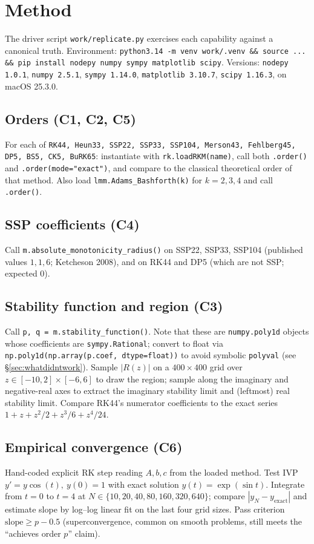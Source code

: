 \documentclass[11pt]{article}
\begin{document}
\section{Method}
The driver script \texttt{work/replicate.py} exercises each capability against a canonical
truth. Environment: \texttt{python3.14 -m venv work/.venv \&\& source ... \&\& pip install
nodepy numpy sympy matplotlib scipy}. Versions: \texttt{nodepy 1.0.1}, \texttt{numpy 2.5.1},
\texttt{sympy 1.14.0}, \texttt{matplotlib 3.10.7}, \texttt{scipy 1.16.3}, on macOS 25.3.0.

\subsection{Orders (C1, C2, C5)}
For each of \texttt{RK44, Heun33, SSP22, SSP33, SSP104, Merson43, Fehlberg45, DP5, BS5,
CK5, BuRK65}: instantiate with \texttt{rk.loadRKM(name)}, call both \texttt{.order()} and
\texttt{.order(mode="exact")}, and compare to the classical theoretical order of that method.
Also load \texttt{lmm.Adams\_Bashforth(k)} for \(k=2,3,4\) and call \texttt{.order()}.

\subsection{SSP coefficients (C4)}
Call \texttt{m.absolute\_monotonicity\_radius()} on SSP22, SSP33, SSP104
(published values \(1,1,6\); Ketcheson 2008), and on RK44 and DP5 (which are not SSP;
expected \(0\)).

\subsection{Stability function and region (C3)}
Call \texttt{p, q = m.stability\_function()}. Note that these are
\texttt{numpy.poly1d} objects whose coefficients are \texttt{sympy.Rational}; convert to float
via \texttt{np.poly1d(np.array(p.coef, dtype=float))} to avoid symbolic \texttt{polyval}
(see \S\ref{sec:whatdidntwork}). Sample \(|R(z)|\) on a \(400\times 400\) grid over
\(z\in[-10,2]\times[-6,6]\) to draw the region; sample along the imaginary and negative-real
axes to extract the imaginary stability limit and (leftmost) real stability limit.
Compare RK44's numerator coefficients to the exact series \(1 + z + z^2/2 + z^3/6 + z^4/24\).

\subsection{Empirical convergence (C6)}
Hand-coded explicit RK step reading \(A, b, c\) from the loaded method. Test IVP
\(y' = y\cos(t),\ y(0)=1\) with exact solution \(y(t)=\exp(\sin t)\). Integrate from
\(t=0\) to \(t=4\) at \(N\in\{10,20,40,80,160,320,640\}\); compare \(|y_N - y_{\text{exact}}|\)
and estimate slope by log--log linear fit on the last four grid sizes. Pass criterion
\(\mathrm{slope}\ge p-0.5\) (superconvergence, common on smooth problems, still meets
the ``achieves order \(p\)'' claim).
\end{document}
